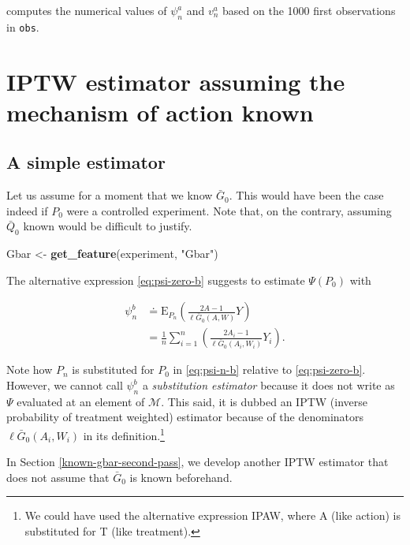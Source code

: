 \documentclass[11pt,openright,twoside]{book}
\newenvironment{Shaded}{\begin{snugshade}}{\end{snugshade}}
\newcommand{\KeywordTok}[1]{\textcolor[rgb]{0.13,0.29,0.53}{\textbf{#1}}}
\newcommand{\NormalTok}[1]{#1}
\newcommand{\StringTok}[1]{\textcolor[rgb]{0.31,0.60,0.02}{#1}}
\newcommand{\defq}{\doteq}
\newcommand{\calM}{\mathcal{M}}
\newcommand{\Exp}{\textrm{E}}
\newcommand{\Gbar}{\bar{G}}
\newcommand{\Qbar}{\bar{Q}}
\theoremstyle{definition}
\theoremstyle{definition}
\theoremstyle{definition}
\theoremstyle{remark}
\begin{document}
computes the numerical values of \(\psi_{n}^{a}\) and \(v_{n}^{a}\) based on the
1000 first observations in \texttt{obs}.

\hypertarget{known-gbar-first-pass}{%
\section{IPTW estimator assuming the mechanism of action known}\label{known-gbar-first-pass}}

\hypertarget{a-simple-estimator}{%
\subsection{A simple estimator}\label{a-simple-estimator}}

Let us assume for a moment that we know \(\Gbar_{0}\). This would have been the
case indeed if \(P_{0}\) were a controlled experiment. Note that, on the
contrary, assuming \(\Qbar_{0}\) known would be difficult to justify.

\begin{Shaded}
\begin{Highlighting}[]
\NormalTok{Gbar <-}\StringTok{ }\KeywordTok{get_feature}\NormalTok{(experiment, }\StringTok{"Gbar"}\NormalTok{)}
\end{Highlighting}
\end{Shaded}

The alternative expression \eqref{eq:psi-zero-b} suggests to estimate
\(\Psi(P_{0})\) with

\begin{align}
\psi_{n}^{b}  &\defq \Exp_{P_{n}}  \left( \frac{2A-1}{\ell  \Gbar_{0}(A,W)} Y
\right) \\ 
&       =        \frac{1}{n}       \sum_{i=1}^{n}       \left(\frac{2A_{i}-1}{
\ell\Gbar_{0}(A_{i},W_{i})}Y_{i} \right). \label{eq:psi-n-b}
\end{align}

Note how \(P_{n}\) is substituted for \(P_{0}\) in \eqref{eq:psi-n-b} relative to
\eqref{eq:psi-zero-b}. However, we cannot call \(\psi_{n}^{b}\) a \emph{substitution
estimator} because it does not write as \(\Psi\) evaluated at an element of
\(\calM\). This said, it is dubbed an IPTW (inverse probability of treatment
weighted) estimator because of the denominators \(\ell\Gbar_{0}(A_{i},W_{i})\)
in its definition.\footnote{We could have used the alternative expression IPAW, where
  A (like action) is substituted for T (like treatment).}

In Section \ref{known-gbar-second-pass}, we develop another IPTW estimator
that does not assume that \(\Gbar_{0}\) is known beforehand.
\end{document}
